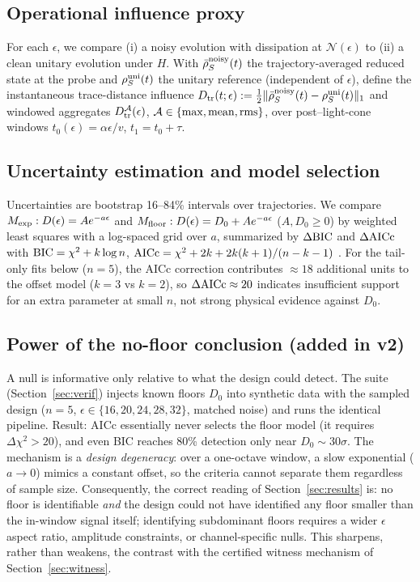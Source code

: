 \documentclass[11pt]{article}
\begin{document}
\subsection{Operational influence proxy}
For each $\epsilon$, we compare (i) a noisy evolution with dissipation at
$\mathcal{N}(\epsilon)$ to (ii) a clean unitary evolution under $H$. With
$\bar\rho^{\rm noisy}_S(t)$ the trajectory-averaged reduced state at the
probe and $\rho^{\rm uni}_S(t)$ the unitary reference (independent of
$\epsilon$), define the instantaneous trace-distance influence
$D_{\rm tr}(t;\epsilon) := \tfrac12 \| \bar\rho^{\rm noisy}_S(t) -
\rho^{\rm uni}_S(t) \|_1$ and windowed aggregates
$D^{\mathcal{A}}_{\rm tr}(\epsilon)$, $\mathcal{A} \in \{\max, {\rm mean},
{\rm rms}\}$, over post--light-cone windows $t_0(\epsilon) =
\alpha\epsilon/v$, $t_1 = t_0 + \tau$.

\subsection{Uncertainty estimation and model selection}
Uncertainties are bootstrap 16--84\% intervals over trajectories. We
compare $M_{\rm exp}: D(\epsilon) = Ae^{-a\epsilon}$ and
$M_{\rm floor}: D(\epsilon) = D_0 + Ae^{-a\epsilon}$ ($A, D_0 \ge 0$) by
weighted least squares with a log-spaced grid over $a$, summarized by
$\Delta{\rm BIC}$ and $\Delta{\rm AICc}$ with ${\rm BIC} = \chi^2 +
k\log n$, ${\rm AICc} = \chi^2 + 2k + 2k(k+1)/(n-k-1)$ \cite{BA, HT}. For
the tail-only fits below ($n = 5$), the AICc correction contributes
$\approx 18$ additional units to the offset model ($k = 3$ vs $k = 2$), so
$\Delta{\rm AICc} \approx 20$ indicates insufficient support for an extra
parameter at small $n$, not strong physical evidence against $D_0$.

\subsection{Power of the no-floor conclusion (added in v2)}
\label{sec:power}
A null is informative only relative to what the design could detect. The
suite (Section~\ref{sec:verif}) injects known floors $D_0$ into synthetic
data with the sampled design ($n = 5$, $\epsilon \in \{16, 20, 24, 28,
32\}$, matched noise) and runs the identical pipeline. Result: AICc
essentially never selects the floor model (it requires
$\Delta\chi^2 > 20$), and even BIC reaches 80\% detection only near
$D_0 \sim 30\sigma$. The mechanism is a \emph{design degeneracy}: over a
one-octave window, a slow exponential ($a \to 0$) mimics a constant
offset, so the criteria cannot separate them regardless of sample size.
Consequently, the correct reading of Section~\ref{sec:results} is: no
floor is identifiable \emph{and} the design could not have identified any
floor smaller than the in-window signal itself; identifying subdominant
floors requires a wider $\epsilon$ aspect ratio, amplitude constraints,
or channel-specific nulls. This sharpens, rather than weakens, the
contrast with the certified witness mechanism of
Section~\ref{sec:witness}.
\end{document}
